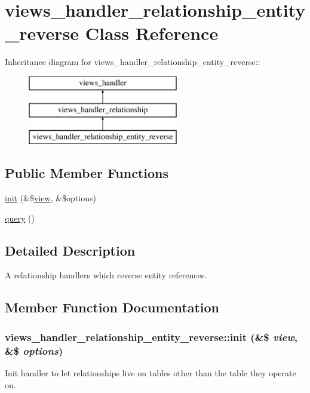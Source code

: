 \hypertarget{classviews__handler__relationship__entity__reverse}{
\section{views\_\-handler\_\-relationship\_\-entity\_\-reverse Class Reference}
\label{classviews__handler__relationship__entity__reverse}
}
Inheritance diagram for views\_\-handler\_\-relationship\_\-entity\_\-reverse::\begin{figure}[H]
\begin{center}
\leavevmode
\includegraphics[height=3cm]{classviews__handler__relationship__entity__reverse}
\end{center}
\end{figure}
\subsection*{Public Member Functions}
\begin{DoxyCompactItemize}
\item 
\hyperlink{classviews__handler__relationship__entity__reverse_a2005d343471091fbaa65ca49e56720d3}{init} (\&\$\hyperlink{classview}{view}, \&\$options)
\item 
\hyperlink{classviews__handler__relationship__entity__reverse_a312255f1150208b21b0ad32fb1412f1a}{query} ()
\end{DoxyCompactItemize}


\subsection{Detailed Description}
A relationship handlers which reverse entity references. 

\subsection{Member Function Documentation}
\hypertarget{classviews__handler__relationship__entity__reverse_a2005d343471091fbaa65ca49e56720d3}{
\subsubsection[{init}]{\setlength{\rightskip}{0pt plus 5cm}views\_\-handler\_\-relationship\_\-entity\_\-reverse::init (\&\$ {\em view}, \/  \&\$ {\em options})}}
\label{classviews__handler__relationship__entity__reverse_a2005d343471091fbaa65ca49e56720d3}
Init handler to let relationships live on tables other than the table they operate on. 

